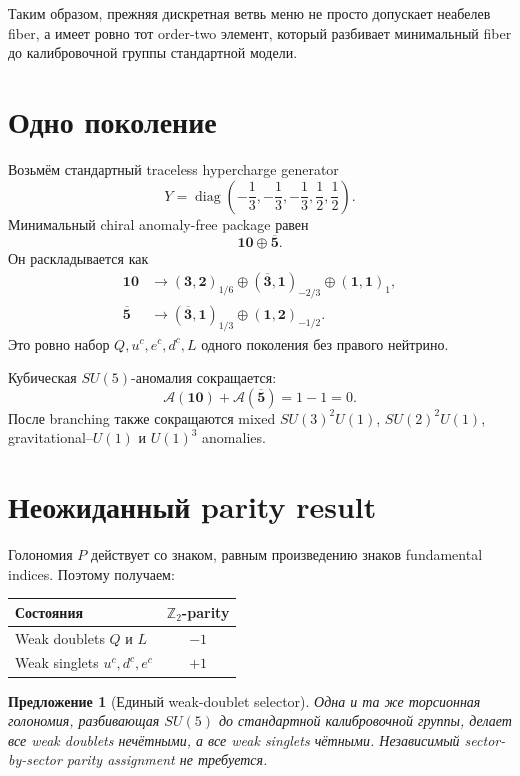 \documentclass[12pt,a4paper]{article}
\newtheorem{proposition}{Предложение}
\begin{document}
Таким образом, прежняя дискретная ветвь меню не просто допускает неабелев fiber, а имеет ровно тот order-two элемент, который разбивает минимальный fiber до калибровочной группы стандартной модели.

\section{Одно поколение}

Возьмём стандартный traceless hypercharge generator
\[
Y=\operatorname{diag}\left(-\frac13,-\frac13,-\frac13,
\frac12,\frac12\right).
\]
Минимальный chiral anomaly-free package равен
\[
\mathbf{10}\oplus\overline{\mathbf5}.
\]
Он раскладывается как
\begin{align}
\mathbf{10}
&\longrightarrow
(\mathbf3,\mathbf2)_{1/6}
\oplus(\overline{\mathbf3},\mathbf1)_{-2/3}
\oplus(\mathbf1,\mathbf1)_1,\\
\overline{\mathbf5}
&\longrightarrow
(\overline{\mathbf3},\mathbf1)_{1/3}
\oplus(\mathbf1,\mathbf2)_{-1/2}.
\end{align}
Это ровно набор \(Q,u^c,e^c,d^c,L\) одного поколения без правого нейтрино.

Кубическая \(SU(5)\)-аномалия сокращается:
\[
\mathcal A(\mathbf{10})+\mathcal A(\overline{\mathbf5})
=1-1=0.
\]
После branching также сокращаются mixed \(SU(3)^2U(1)\), \(SU(2)^2U(1)\), gravitational--\(U(1)\) и \(U(1)^3\) anomalies.

\section{Неожиданный parity result}

Голономия \(P\) действует со знаком, равным произведению знаков fundamental indices. Поэтому получаем:
\begin{center}
\begin{tabular}{>{\raggedright\arraybackslash}p{}c}
\toprule
Состояния & \(\mathbb Z_2\)-parity \\
\midrule
Weak doublets \(Q\) и \(L\) & \(-1\) \\
Weak singlets \(u^c,d^c,e^c\) & \(+1\) \\
\bottomrule
\end{tabular}
\end{center}

\begin{proposition}[Единый weak-doublet selector]
Одна и та же торсионная голономия, разбивающая \(SU(5)\) до стандартной калибровочной группы, делает все weak doublets нечётными, а все weak singlets чётными. Независимый sector-by-sector parity assignment не требуется.
\end{proposition}
\end{document}
